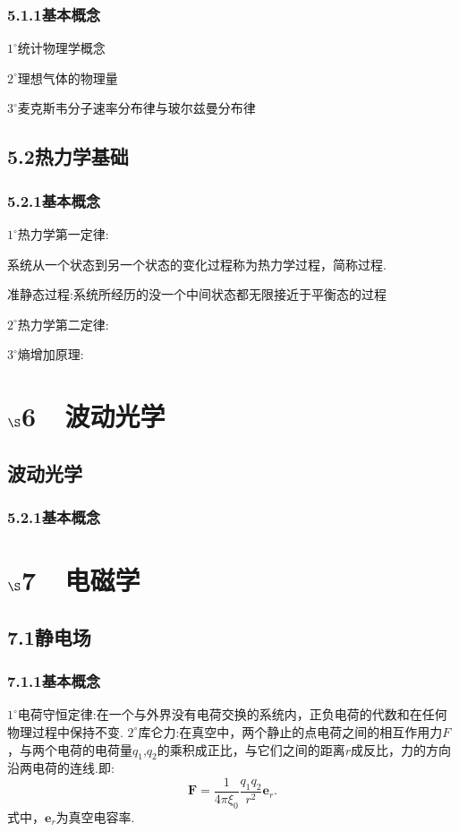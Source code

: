 \documentclass[UTF8]{ctexart}
\begin{document}
	\subsubsection*{5.1.1基本概念}
	$1^{\circ}$统计物理学概念

	$2^{\circ}$理想气体的物理量

	$3^{\circ}$麦克斯韦分子速率分布律与玻尔兹曼分布律

	\subsection*{5.2热力学基础}
	\subsubsection*{5.2.1基本概念}
	$1^{\circ}$热力学第一定律:

	系统从一个状态到另一个状态的变化过程称为热力学过程，简称过程.

	准静态过程:系统所经历的没一个中间状态都无限接近于平衡态的过程

	

	$2^{\circ}$热力学第二定律:

	$3^{\circ}$熵增加原理:

\newpage
	\section*{$\S$6~~波动光学}
	\subsection*{波动光学}
	\subsubsection*{5.2.1基本概念}


\newpage
\section*{$\S$7~~电磁学}
\subsection*{7.1静电场}
\subsubsection*{7.1.1基本概念}
	$1^{\circ}$电荷守恒定律:在一个与外界没有电荷交换的系统内，正负电荷的代数和在任何物理过程中保持不变.
	$2^{\circ}$库仑力:在真空中，两个静止的点电荷之间的相互作用力$F$，与两个电荷的电荷量$q_1$,$q_2$的乘积成正比，与它们之间的距离$r$成反比，力的方向沿两电荷的连线.即:
	\begin{equation*}
		{\boldsymbol F}=\frac{1}{4\pi\xi_0}\frac{q_1q_2}{r^2}{\boldsymbol e}_r.
	\end{equation*}
	式中，${\boldsymbol e}_r$为真空电容率.
\end{document}

